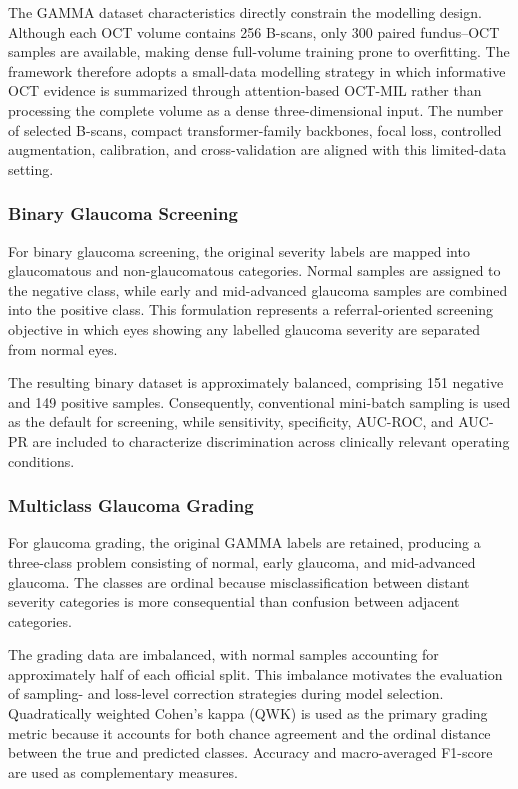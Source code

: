 \documentclass{ieeeaccess}
\begin{document}
The GAMMA dataset characteristics directly constrain the modelling design. Although each OCT volume contains 256 B-scans, only 300 paired fundus--OCT samples are available, making dense full-volume training prone to overfitting. The framework therefore adopts a small-data modelling strategy in which informative OCT evidence is summarized through attention-based OCT-MIL rather than processing the complete volume as a dense three-dimensional input. The number of selected B-scans, compact transformer-family backbones, focal loss, controlled augmentation, calibration, and cross-validation are aligned with this limited-data setting.

\subsubsection{Binary Glaucoma Screening}
\label{subsubsec:binary_screening}

For binary glaucoma screening, the original severity labels are mapped into glaucomatous and non-glaucomatous categories. Normal samples are assigned to the negative class, while early and mid-advanced glaucoma samples are combined into the positive class. This formulation represents a referral-oriented screening objective in which eyes showing any labelled glaucoma severity are separated from normal eyes.

The resulting binary dataset is approximately balanced, comprising 151 negative and 149 positive samples. Consequently, conventional mini-batch sampling is used as the default for screening, while sensitivity, specificity, AUC-ROC, and AUC-PR are included to characterize discrimination across clinically relevant operating conditions.

\subsubsection{Multiclass Glaucoma Grading}
\label{subsubsec:multiclass_grading}

For glaucoma grading, the original GAMMA labels are retained, producing a three-class problem consisting of normal, early glaucoma, and mid-advanced glaucoma. The classes are ordinal because misclassification between distant severity categories is more consequential than confusion between adjacent categories.

The grading data are imbalanced, with normal samples accounting for approximately half of each official split. This imbalance motivates the evaluation of sampling- and loss-level correction strategies during model selection. Quadratically weighted Cohen's kappa (QWK) is used as the primary grading metric because it accounts for both chance agreement and the ordinal distance between the true and predicted classes. Accuracy and macro-averaged F1-score are used as complementary measures.
\end{document}
